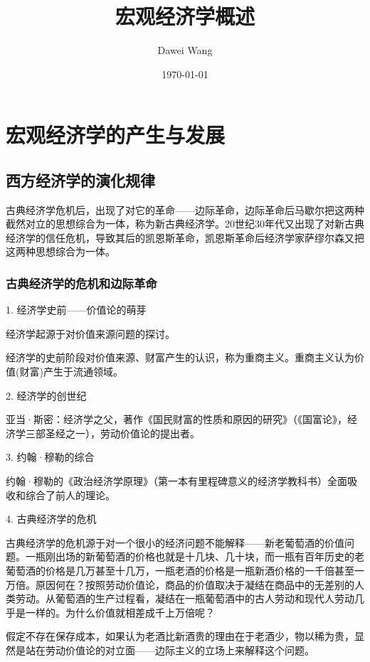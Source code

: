 \documentclass{article}
\title{宏观经济学概述}
\author{Dawei Wang}
\date{\today}
\begin{document}
	\maketitle
\section{宏观经济学的产生与发展}
\subsection{西方经济学的演化规律}
古典经济学危机后，出现了对它的革命——边际革命，边际革命后马歇尔把这两种截然对立的思想综合为一体，称为新古典经济学。20世纪30年代又出现了对新古典经济学的信任危机，导致其后的凯恩斯革命，凯恩斯革命后经济学家萨缪尔森又把这两种思想综合为一体。

\subsubsection{古典经济学的危机和边际革命}

1. 经济学史前——价值论的萌芽

经济学起源于对价值来源问题的探讨。

经济学的史前阶段对价值来源、财富产生的认识，称为重商主义。重商主义认为价值(财富)产生于流通领域。

\hspace*{\fill}

2. 经济学的创世纪

亚当·斯密：经济学之父，著作《国民财富的性质和原因的研究》（《国富论》，经济学三部圣经之一），劳动价值论的提出者。

\hspace*{\fill}

3. 约翰·穆勒的综合

约翰·穆勒的《政治经济学原理》（第一本有里程碑意义的经济学教科书）全面吸收和综合了前人的理论。

\hspace*{\fill}

4. 古典经济学的危机

古典经济学的危机源于对一个很小的经济问题不能解释——新老葡萄酒的价值问题。一瓶刚出场的新葡萄酒的价格也就是十几块、几十块，而一瓶有百年历史的老葡萄酒的价格是几万甚至十几万，一瓶老酒的价格是一瓶新酒价格的一千倍甚至一万倍。原因何在？按照劳动价值论，商品的价值取决于凝结在商品中的无差别的人类劳动。从葡萄酒的生产过程看，凝结在一瓶葡萄酒中的古人劳动和现代人劳动几乎是一样的。为什么价值就相差成千上万倍呢？

假定不存在保存成本，如果认为老酒比新酒贵的理由在于老酒少，物以稀为贵，显然是站在劳动价值论的对立面——边际主义的立场上来解释这个问题。
\end{document}
